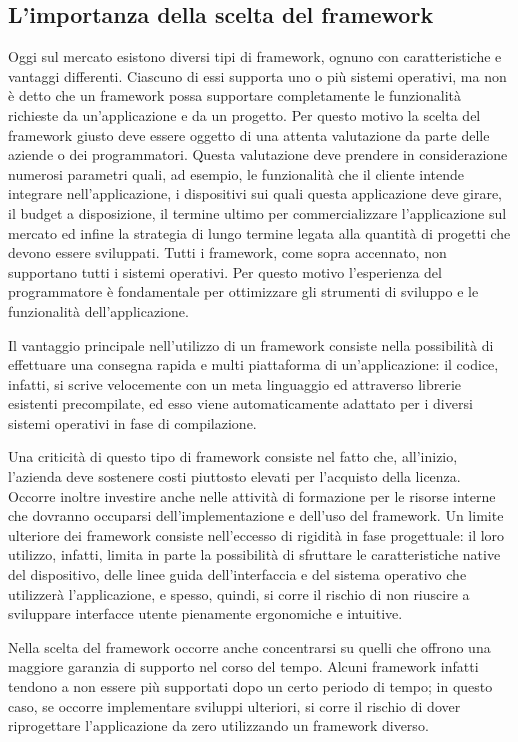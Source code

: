 \subsection{L'importanza della scelta del framework}

Oggi sul mercato esistono diversi tipi di framework, ognuno con caratteristiche e vantaggi differenti. Ciascuno di essi supporta uno o più sistemi operativi, ma non è detto che un framework possa supportare completamente le funzionalità richieste da un'applicazione e da un progetto.
Per questo motivo la scelta del framework giusto deve essere oggetto di una attenta valutazione da parte delle aziende o dei programmatori. Questa valutazione deve prendere in considerazione numerosi parametri quali, ad esempio, le funzionalità che il cliente intende integrare nell'applicazione, i dispositivi sui quali questa applicazione deve girare, il budget a disposizione, il termine ultimo per commercializzare l'applicazione sul mercato ed infine la strategia di lungo termine legata alla quantità di progetti che devono essere sviluppati.
Tutti i framework, come sopra accennato, non supportano tutti i sistemi operativi. Per questo motivo l'esperienza del programmatore è fondamentale per ottimizzare gli strumenti di sviluppo e le funzionalità dell'applicazione.

Il vantaggio principale nell'utilizzo di un framework consiste nella possibilità di effettuare una consegna rapida e multi piattaforma di un'applicazione: il codice, infatti, si scrive velocemente con un meta linguaggio ed attraverso librerie esistenti precompilate, ed esso viene automaticamente adattato per i diversi sistemi operativi in fase di compilazione.

Una criticità di questo tipo di framework consiste nel fatto che, all'inizio, l'azienda deve sostenere costi piuttosto elevati per l'acquisto della licenza. Occorre inoltre investire anche nelle attività di formazione per le risorse interne che dovranno occuparsi dell'implementazione e dell'uso del framework. Un limite ulteriore dei framework consiste nell'eccesso di rigidità in fase progettuale: il loro utilizzo, infatti, limita in parte la possibilità di sfruttare le caratteristiche native del dispositivo, delle linee guida dell'interfaccia e del sistema operativo che utilizzerà l'applicazione, e spesso, quindi, si corre il rischio di non riuscire a sviluppare interfacce utente pienamente ergonomiche e intuitive.

Nella scelta del framework occorre anche concentrarsi su quelli che offrono una maggiore garanzia di supporto nel corso del tempo. Alcuni framework infatti tendono a non essere più supportati dopo un certo periodo di tempo; in questo caso, se occorre implementare sviluppi ulteriori, si corre il rischio di dover riprogettare l'applicazione da zero utilizzando un framework diverso.

